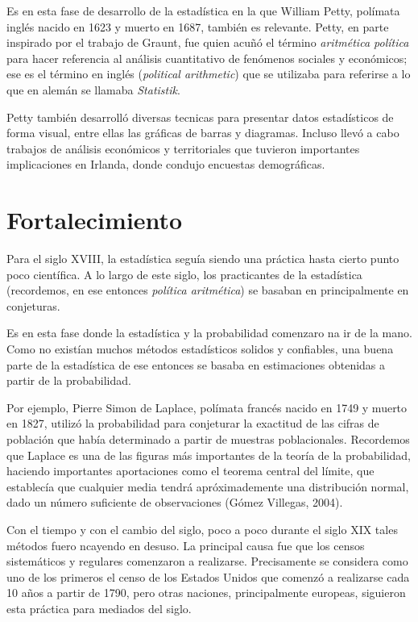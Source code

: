 \documentclass[12pt, a4paper]{article}
\begin{document}
Es en esta fase de desarrollo de la estadística en la que William Petty, polímata inglés nacido en 1623 y muerto en 1687, también es relevante. Petty, en parte inspirado por el trabajo de Graunt, fue quien acuñó el término \textit{aritmética política} para hacer referencia al análisis cuantitativo de fenómenos sociales y económicos; ese es el término en inglés (\textit{political arithmetic}) que se utilizaba para referirse a lo que en alemán se llamaba \textit{Statistik}.

Petty también desarrolló diversas tecnicas para presentar datos estadísticos de forma visual, entre ellas las gráficas de barras y diagramas. Incluso llevó a cabo trabajos de análisis económicos y territoriales que tuvieron importantes implicaciones en Irlanda, donde condujo encuestas demográficas.

\section{Fortalecimiento}

Para el siglo XVIII, la estadística seguía siendo una práctica hasta cierto punto poco científica. A lo largo de este siglo, los practicantes de la estadística (recordemos, en ese entonces \textit{política aritmética}) se basaban en principalmente en conjeturas.

Es en esta fase donde la estadística y la probabilidad comenzaro na ir de la mano. Como no existían muchos métodos estadísticos solidos y confiables, una buena parte de la estadística de ese entonces se basaba en estimaciones obtenidas a partir de la probabilidad.

Por ejemplo, Pierre Simon de Laplace, polímata francés nacido en 1749 y muerto en 1827, utilizó la probabilidad para conjeturar la exactitud de las cifras de población que había determinado a partir de muestras poblacionales. Recordemos que Laplace es una de las figuras más importantes de la teoría de la probabilidad, haciendo importantes aportaciones como el teorema central del límite, que establecía que cualquier media tendrá apróximademente una distribución normal, dado un número suficiente de observaciones (Gómez Villegas, 2004).

Con el tiempo y con el cambio del siglo, poco a poco durante el siglo XIX tales métodos fuero ncayendo en desuso. La principal causa fue que los censos sistemáticos y regulares comenzaron a realizarse. Precisamente se considera como uno de los primeros el censo de los Estados Unidos que comenzó a realizarse cada 10 años a partir de 1790, pero otras naciones, principalmente europeas, siguieron esta práctica para mediados del siglo.
\end{document}
